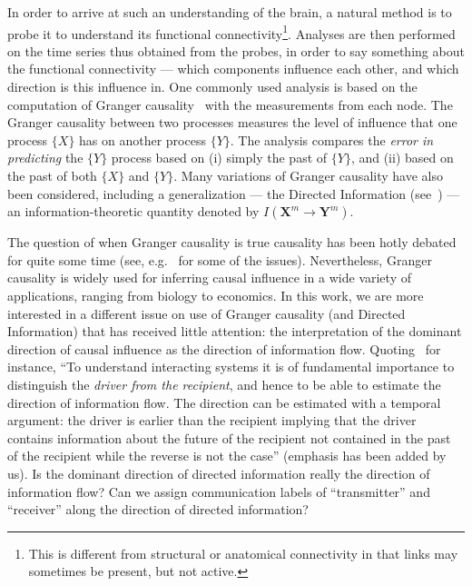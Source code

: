 \documentclass[conference]{IEEEtran}
\newcommand{\m}[1]{\mathbf{#1}^m}
\begin{document}
In order to arrive at such an understanding of the brain, a natural method is to probe it to understand its functional connectivity\footnote{This is different from structural or anatomical connectivity in that links may sometimes be present, but not active.}. Analyses are then performed on the time series thus obtained from the probes, in order to say something about the functional connectivity --- which components influence each other, and which direction is this influence in. One commonly used analysis is based on the computation of Granger causality~\cite{Granger} with the measurements from each node. The Granger causality between two processes measures the level of influence that one process $\{X\}$ has on another process $\{Y\}$. The analysis compares the \textit{error in predicting} the $\{Y\}$ process based on (i) simply the past of $\{Y\}$, and (ii) based on the past of both $\{X\}$ and $\{Y\}$. Many variations of Granger causality have also been considered, including a generalization --- the Directed Information (see~\cite{MasseyCausality,quinn,weissman}) --- an information-theoretic quantity denoted by $I(\m{X}\to\m{Y})$. %

The question of when Granger causality is true causality has been hotly debated for quite some time (see, e.g.~\cite{jacobs1979difficulties} for some of the issues). Nevertheless, Granger causality is widely used for inferring causal influence in a wide variety of applications, ranging from biology to economics. In this work, we are more interested in a different issue on use of Granger causality (and Directed Information) that has received little attention: the interpretation of the dominant direction of causal influence as the direction of information flow. Quoting~\cite{nolte2008robustly} for instance, ``To understand interacting systems it is of fundamental importance to distinguish the \emph{driver from the recipient}, and hence to be able to estimate the direction of information flow. The direction can be estimated with a temporal argument: the driver is earlier than the recipient implying that the driver contains information about the future of the recipient not contained in the past of the recipient while the reverse is not the case'' (emphasis has been added by us). Is the dominant direction of directed information really the direction of information flow? Can we assign communication labels of ``transmitter'' and ``receiver'' along the direction of directed information?
\end{document}
